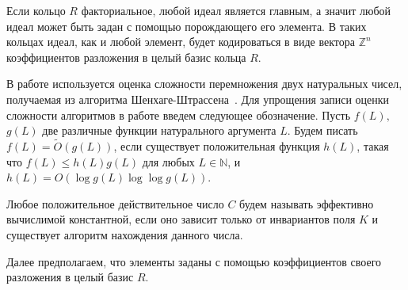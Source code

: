 \documentclass[_00_dissertation.tex]{subfiles}
\begin{document}
\begin{remark}
    Если кольцо $R$ факториальное, любой идеал является главным, а значит любой идеал может быть задан с помощью порождающего его элемента.
    В таких кольцах идеал, как и любой элемент, будет кодироваться в виде вектора $\mathbb{Z}^n$ коэффициентов разложения в целый базис кольца $R$.
\end{remark}

\begin{remark}
    В работе используется оценка сложности перемножения двух натуральных чисел, получаемая из алгоритма Шенхаге-Штрассена~\cite{source:Schonhage}.
    Для упрощения записи оценки сложности алгоритмов в работе введем следующее обозначение.
    Пусть $f(L),$ $g(L)$ две различные функции натурального аргумента $L$.
    Будем писать $f(L) = \tilde O(g(L))$, если существует положительная функция $h(L)$, такая что $f(L) \le h(L)g(L)$ для любых $L \in \mathbb{N}$, и $h(L) = O(\log g(L)\log \log g(L))$.
    
    Любое положительное действительное число $C$ будем называть эффективно вычислимой константной, если оно зависит только от инвариантов поля $K$ и существует алгоритм нахождения данного числа.
\end{remark}

Далее предполагаем, что элементы заданы с помощью коэффициентов своего разложения в целый базис $R$.
\end{document}
